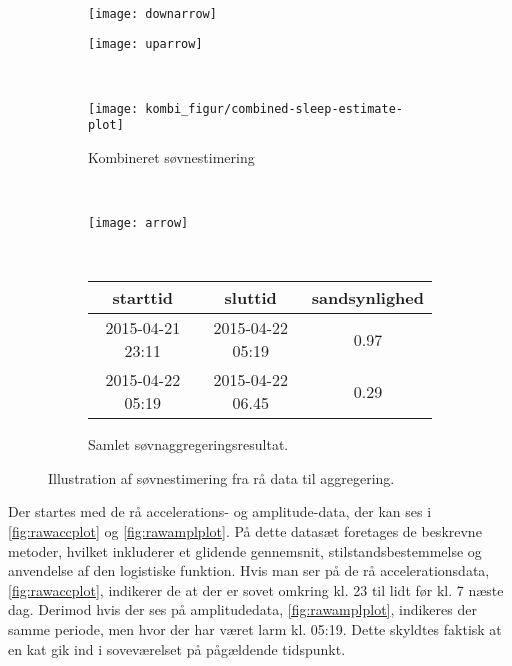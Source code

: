 \begin{figure}
\begin{minipage}{\linewidth}
\begin{subfigure}{0.5\linewidth}
		\end{subfigure}
	\end{minipage}\\[1ex]%
	\begin{minipage}{\linewidth}
		\begin{subfigure}{0.5\linewidth}
			\centering
			\texttt{[image: downarrow]}
		\end{subfigure}
		\begin{subfigure}{0.5\linewidth}
			\centering
			\texttt{[image: uparrow]}
		\end{subfigure}
	\end{minipage}\\[1ex]%
	\begin{minipage}{\linewidth}
		\begin{subfigure}{\linewidth}
			\centering
			\texttt{[image: kombi\_figur/combined-sleep-estimate-plot]}
			\caption{Kombineret søvnestimering}\label{fig:sleepcalcombine}
		\end{subfigure}
	\end{minipage}\\[1ex]%
	\begin{minipage}{\linewidth}
		\begin{subfigure}{\linewidth}
			\centering
			\texttt{[image: arrow]}
		\end{subfigure}
	\end{minipage}\\[1ex]%
	\begin{minipage}{\linewidth}
		\begin{subfigure}{\linewidth}
			\centering
			\begin{tabular}{|c|c|c|}
			\hline starttid & sluttid & sandsynlighed \\ 
			\hline 2015-04-21 23:11 & 2015-04-22 05:19 & 0.97 \\ 
			\hline 2015-04-22 05:19 & 2015-04-22 06.45 & 0.29 \\ 
			\hline 
			\end{tabular}
			\caption{Samlet søvnaggregeringsresultat.}\label{fig:finalagg}
		\end{subfigure}
	\end{minipage}
	\caption{Illustration af søvnestimering fra rå data til aggregering.}\label{fig:totalbanjo}
\end{figure}

Der startes med de rå accelerations- og amplitude-data, der kan ses i \cref{fig:rawaccplot} og \cref{fig:rawamplplot}.
På dette datasæt foretages de beskrevne metoder, hvilket inkluderer et glidende gennemsnit, stilstandsbestemmelse og anvendelse af den logistiske funktion.
Hvis man ser på de rå accelerationsdata, \cref{fig:rawaccplot}, indikerer de at der er sovet omkring kl. 23 til lidt før kl. 7 næste dag.
Derimod hvis der ses på amplitudedata, \cref{fig:rawamplplot}, indikeres der samme periode, men hvor der har været larm kl. 05:19.
Dette skyldtes faktisk at en kat gik ind i soveværelset på pågældende tidspunkt.

